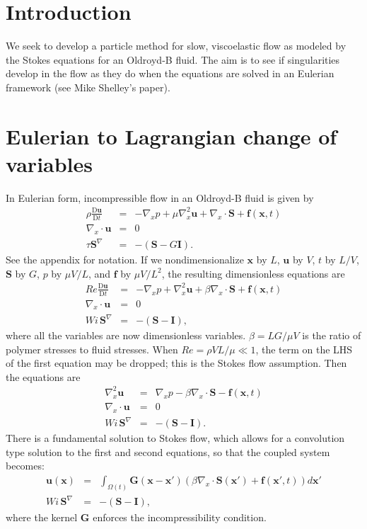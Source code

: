 \documentclass[12pt]{article}
\newcommand{\baa}[1]{\begin{eqnarray} #1 \end{eqnarray}}
\newcommand{\baas}[1]{\begin{eqnarray*} #1 \end{eqnarray*}}
\newcommand{\bx}{{\mathbf x}}
\newcommand{\bu}{{\mathbf u}}
\newcommand{\ff}{{\mathbf f}}
\newcommand{\bS}{{\mathbf S}}
\newcommand{\bI}{{\mathbf I}}
\newcommand{\bG}{{\mathbf G}}
\begin{document}
	\section{Introduction}
	
	We seek to develop a particle method for slow, viscoelastic flow as modeled by the Stokes equations for an Oldroyd-B fluid.  The aim is to see if singularities develop in the flow as they do when the equations are solved in an Eulerian framework (see Mike Shelley's paper).
	
	\section{Eulerian to Lagrangian change of variables}
	
	In Eulerian form, incompressible flow in an Oldroyd-B fluid is given by
	\baas{
	\rho\frac{\text{D} \bu}{\text{D}t} &=& -\nabla_x p + \mu\nabla_x^2\bu + \nabla_x \cdot \bS + \ff(\bx,t) \\
	\nabla_x \cdot \bu &=& 0 \\
	\tau\bS^\nabla &=& -\left( \bS - G\bI\right).
	}
	See the appendix for notation. If we nondimensionalize $\bx$ by $L$, $\bu$ by $V$, $t$ by $L/V$, $\bS$ by $G$, $p$ by $\mu V /L$, and $\ff$ by $\mu V/L^2$, the resulting dimensionless equations are
	\baas{
	Re\frac{\text{D} \bu}{\text{D}t} &=& -\nabla_x p + \nabla_x^2\bu + \beta \nabla_x \cdot \bS + \ff(\bx,t) \\
	\nabla_x \cdot \bu &=& 0 \\
	Wi\,\bS^\nabla &=& -\left( \bS - \bI\right),
	}
	where all the variables are now dimensionless variables. $\beta = LG/\mu V$ is the ratio of polymer stresses to fluid stresses. When $Re = \rho V L/ \mu \ll 1$, the term on the LHS of the first equation may be dropped; this is the Stokes flow assumption. Then the equations are
	\baas{
	 \nabla_x^2\bu &=& \nabla_x p - \beta \nabla_x \cdot \bS - \ff(\bx,t) \\
	\nabla_x \cdot \bu &=& 0 \\
	Wi\,\bS^\nabla &=& -\left( \bS - \bI\right).
	}
	There is a fundamental solution to Stokes flow, which allows for a convolution type solution to the first and second equations, so that the coupled system becomes:
	\baa{
	 \bu(\bx) &=& \int_{\Omega(t)} \bG(\bx - \bx') \left( \beta \nabla_x \cdot \bS(\bx') + \ff(\bx',t) \right) d\bx' \label{eqn:Eulervel}\\
	Wi\,\bS^\nabla &=& -\left( \bS - \bI\right), \label{eqn:Eulerstress}
	}
	where the kernel $\bG$ enforces the incompressibility condition.
	
\end{document}
